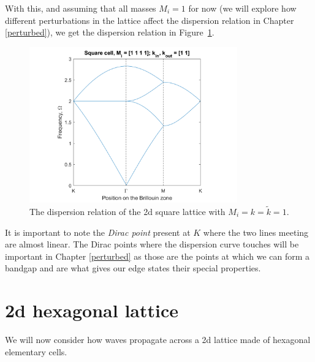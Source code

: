 With this, and assuming that all masses $M_i=1$ for now (we will explore how
different perturbations in the lattice affect the dispersion relation in
Chapter \ref{perturbed}), we get the dispersion relation in
Figure~\ref{fig:sqdisper}. 

\begin{figure}[!h]
\centering
\includegraphics[width=0.8\textwidth]{imgs/sqdisper.png}
\caption{\label{fig:sqdisper} The dispersion relation of the 2d square lattice
  with $M_i=k=\tilde{k}=1$.}
\end{figure}

It is important to note the \textit{Dirac point} present at $K$ where the two
lines meeting are almost linear. The Dirac points where the dispersion curve
touches will be important in Chapter \ref{perturbed} as those are the points at
which we can form a bandgap and are what gives our edge states their special
properties.

\section{2d hexagonal lattice}
\label{2dhexdisper}
We will now consider how waves propagate across a 2d lattice made of hexagonal
elementary cells. 

